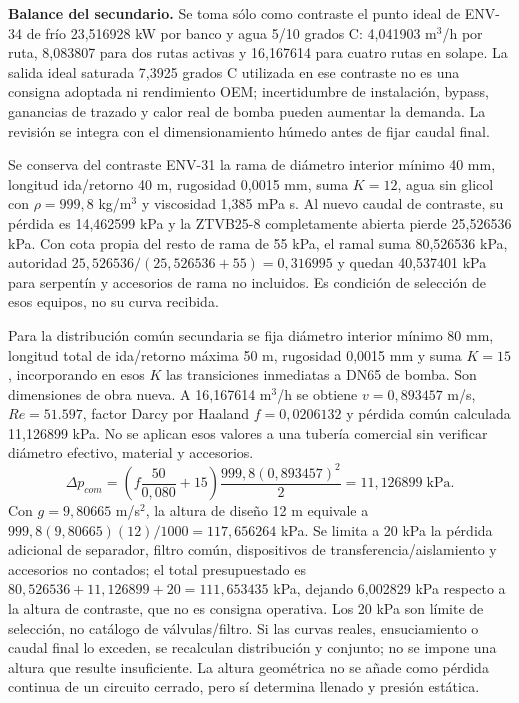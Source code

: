 \textbf{Balance del secundario.} Se toma sólo como contraste el punto ideal de ENV-34 de frío 23,516928 kW por banco y agua 5/10 grados C: 4,041903 m$^3$/h por ruta, 8,083807 para dos rutas activas y 16,167614 para cuatro rutas en solape. La salida ideal saturada 7,3925 grados C utilizada en ese contraste no es una consigna adoptada ni rendimiento OEM; incertidumbre de instalación, bypass, ganancias de trazado y calor real de bomba pueden aumentar la demanda. La revisión se integra con el dimensionamiento húmedo antes de fijar caudal final.

Se conserva del contraste ENV-31 la rama de diámetro interior mínimo 40 mm, longitud ida/retorno 40 m, rugosidad 0,0015 mm, suma $K=12$, agua sin glicol con $\rho=999,8$ kg/m$^3$ y viscosidad 1,385 mPa s. Al nuevo caudal de contraste, su pérdida es 14,462599 kPa y la ZTVB25-8 completamente abierta pierde 25,526536 kPa. Con cota propia del resto de rama de 55 kPa, el ramal suma 80,526536 kPa, autoridad $25,526536/(25,526536+55)=0,316995$ y quedan 40,537401 kPa para serpentín y accesorios de rama no incluidos. Es condición de selección de esos equipos, no su curva recibida.

Para la distribución común secundaria se fija diámetro interior mínimo 80 mm, longitud total de ida/retorno máxima 50 m, rugosidad 0,0015 mm y suma $K=15$, incorporando en esos $K$ las transiciones inmediatas a DN65 de bomba. Son dimensiones de obra nueva. A 16,167614 m$^3$/h se obtiene $v=0,893457$ m/s, $Re=51.597$, factor Darcy por Haaland $f=0,0206132$ y pérdida común calculada 11,126899 kPa. No se aplican esos valores a una tubería comercial sin verificar diámetro efectivo, material y accesorios.
\[
\Delta p_{com}=\left(f\frac{50}{0,080}+15\right)\frac{999,8(0,893457)^2}{2}=11,126899\;\mathrm{kPa}.
\]
Con $g=9,80665$ m/s$^2$, la altura de diseño 12 m equivale a $999,8(9,80665)(12)/1000=117,656264$ kPa. Se limita a 20 kPa la pérdida adicional de separador, filtro común, dispositivos de transferencia/aislamiento y accesorios no contados; el total presupuestado es $80,526536+11,126899+20=111,653435$ kPa, dejando 6,002829 kPa respecto a la altura de contraste, que no es consigna operativa. Los 20 kPa son límite de selección, no catálogo de válvulas/filtro. Si las curvas reales, ensuciamiento o caudal final lo exceden, se recalculan distribución y conjunto; no se impone una altura que resulte insuficiente. La altura geométrica no se añade como pérdida continua de un circuito cerrado, pero sí determina llenado y presión estática.

